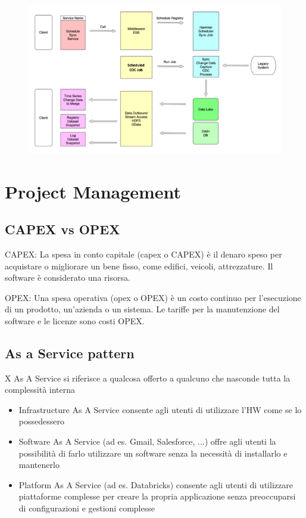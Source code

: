 \documentclass{article}
\begin{document}
\begin{figure}[htp]
    \centering
    \includegraphics[width=\linewidth]{fig/batch_sync_data_process.png}
    \label{fig:Batch Sync Data Process}
\end{figure}
\section{Project Management}
\subsection{CAPEX vs OPEX}
CAPEX: La spesa in conto capitale (capex o CAPEX) è il denaro speso per acquistare o migliorare un bene fisso, come edifici, veicoli, attrezzature. Il software è considerato una risorsa.

OPEX: Una spesa operativa (opex o OPEX) è un costo continuo per l'esecuzione di un prodotto, un'azienda o un sistema. Le tariffe per la manutenzione del software e le licenze sono costi OPEX.
\subsection{As a Service pattern}
X As A Service si riferisce a qualcosa offerto a qualcuno che nasconde tutta la complessità interna
\begin{itemize}
    \item Infrastructure As A Service consente agli utenti di utilizzare l'HW come se lo possedessero
    \item Software As A Service (ad es. Gmail, Salesforce, ...) offre agli utenti la possibilità di farlo
utilizzare un software senza la necessità di installarlo e mantenerlo
    \item Platform As A Service (ad es. Databricks) consente agli utenti di utilizzare piattaforme complesse per creare la propria applicazione senza preoccuparsi di configurazioni e gestioni complesse
\end{itemize}
\end{document}
